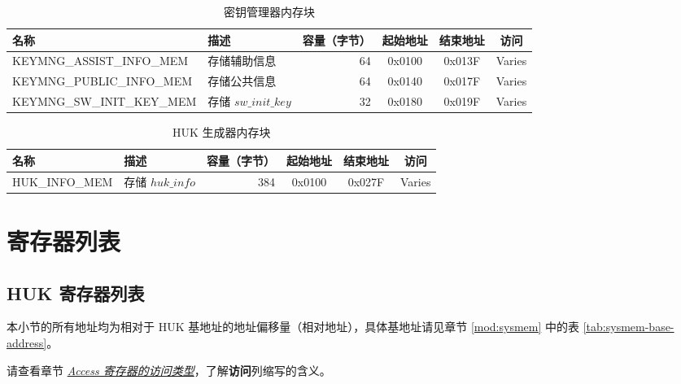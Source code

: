\documentclass[main\_\_CN.tex]{subfiles}
\begin{document}
\begin{longtable}{ | p{4.6cm} | p{4cm} | r | c | c | c | }
\caption{密钥管理器内存块} \label{tab:keymng-mem-blocks}
\\ \hline
\rowcolor{lightgray}
\textbf{名称} & \textbf{描述}  &  \textbf{容量（字节）} &  \textbf{起始地址}  &  \textbf{结束地址}  & \textbf{访问}   \\ \hline
KEYMNG\_ASSIST\_INFO\_MEM\label{mem:keymng-assist-info} & 存储辅助信息 &   64  &  0x0100  &  0x013F  &  Varies  \\ \hline
KEYMNG\_PUBLIC\_INFO\_MEM\label{mem:keymng-public-info} & 存储公共信息    &   64  &  0x0140  &  0x017F  &  Varies  \\ \hline
KEYMNG\_SW\_INIT\_KEY\_MEM\label{mem:keymng-sw-init-key} & 存储 \begin{math}sw\_init\_key\end{math}  &   32  &  0x0180  &  0x019F  &  Varies  \\ \hline
\end{longtable}

\begin{longtable}{ | p{4.6cm} | p{4cm} | r | c | c | c | }
\caption{HUK 生成器内存块} \label{tab:huk-mem-blocks}
\\ \hline
\rowcolor{lightgray}
\textbf{名称} & \textbf{描述}  &  \textbf{容量（字节）} &  \textbf{起始地址}  &  \textbf{结束地址}  & \textbf{访问}  \\ \hline
HUK\_INFO\_MEM\label{mem:huk-info} & 存储 \hyperref[para:hukinfo]{\begin{math}huk\_info\end{math}}  &  384  &  0x0100  &  0x027F  &  Varies  \\ \hline
\end{longtable}

\section{寄存器列表}
\label{sec:keymng-reg-summ}

\subsection{HUK 寄存器列表}
本小节的所有地址均为相对于 HUK 基地址的地址偏移量（相对地址），具体基地址请见章节  \ref{mod:sysmem} \textit{} 中的表  \ref{tab:sysmem-base-address}。


请查看章节  \hyperref[glossary-access-types]{\textit{Access 寄存器的访问类型}}，了解\textbf{访问}列缩写的含义。
\end{document}
